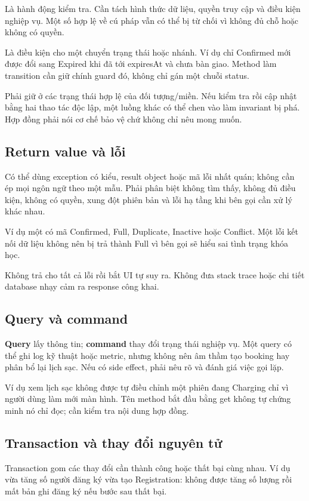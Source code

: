 Là hành động kiểm tra. Cần tách hình thức dữ liệu, quyền truy cập và điều kiện nghiệp vụ. Một số hợp lệ về cú pháp vẫn có thể bị từ chối vì không đủ chỗ hoặc không có quyền.

Là điều kiện cho một chuyển trạng thái hoặc nhánh. Ví dụ chỉ Confirmed mới được đổi sang Expired khi đã tới expiresAt và chưa bàn giao. Method làm transition cần giữ chính guard đó, không chỉ gán một chuỗi status.

Phải giữ ở các trạng thái hợp lệ của đối tượng/miền. Nếu kiểm tra rồi cập nhật bằng hai thao tác độc lập, một luồng khác có thể chen vào làm invariant bị phá. Hợp đồng phải nói cơ chế bảo vệ chứ không chỉ nêu mong muốn.

\subsection{Return value và lỗi}
Có thể dùng exception có kiểu, result object hoặc mã lỗi nhất quán; không cần ép mọi ngôn ngữ theo một mẫu. Phải phân biệt không tìm thấy, không đủ điều kiện, không có quyền, xung đột phiên bản và lỗi hạ tầng khi bên gọi cần xử lý khác nhau.

Ví dụ một  có mã Confirmed, Full, Duplicate, Inactive hoặc Conflict. Một lỗi kết nối dữ liệu không nên bị trả thành Full vì bên gọi sẽ hiểu sai tình trạng khóa học.

Không trả  cho tất cả lỗi rồi bắt UI tự suy ra. Không đưa stack trace hoặc chi tiết database nhạy cảm ra response công khai.

\subsection{Query và command}
\textbf{Query} lấy thông tin; \textbf{command} thay đổi trạng thái nghiệp vụ. Một query có thể ghi log kỹ thuật hoặc metric, nhưng không nên âm thầm tạo booking hay phân bổ lại lịch sạc. Nếu có side effect, phải nêu rõ và đánh giá việc gọi lặp.

Ví dụ xem lịch sạc không được tự điều chỉnh một phiên đang Charging chỉ vì người dùng làm mới màn hình. Tên method bắt đầu bằng get không tự chứng minh nó chỉ đọc; cần kiểm tra nội dung hợp đồng.

\subsection{Transaction và thay đổi nguyên tử}
Transaction gom các thay đổi cần thành công hoặc thất bại cùng nhau. Ví dụ vừa tăng số người đăng ký vừa tạo Registration: không được tăng số lượng rồi mất bản ghi đăng ký nếu bước sau thất bại.

